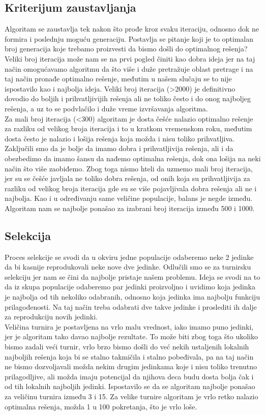 \documentclass[a4paper]{article}
\begin{document}
\subsection{Kriterijum zaustavljanja}
Algoritam se zaustavlja tek nakon što prođe kroz svaku iteraciju, odnosno dok ne formira i poslednju moguću generaciju. Postavlja se pitanje koji je to optimalan broj generacija koje trebamo proizvesti da bismo došli do optimalnog rešenja? \\ 
Veliki broj iteracija može nam se na prvi pogled činiti kao dobra ideja jer na taj način omogućavamo algoritmu da što više i duže pretražuje oblast pretrage i na taj način pronađe optimalno rešenje, međutim u našem slučaju se to nije ispostavilo kao i najbolja ideja. Veliki broj iteracija (>2000) je definitivno dovodio do boljih i prihvatljivijih rešenja ali ne toliko često i do onog najboljeg rešenja, a uz to se podvlačilo i duže vreme izvršavanja algoritma. \\
Za mali broj iteracija (<300) algoritam je dosta češće nalazio optimalno rešenje za razliku od velikog broja iteracija i to u kratkom vremenskom roku, međutim dosta često je nalazio i lošija rešenja koja možda i nisu toliko prihvatljiva. \\
Zaključili smo da je bolje da imamo dobra i prihvatljivija rešenja, ali i da obezbedimo da imamo šansu da nađemo optimalna rešenja, dok ona lošija na neki način što više zaobiđemo. Zbog toga nismo hteli da uzmemo mali broj iteracija, jer su se češće javljala ne toliko dobra rešenja, od onih koja su prihvatljivija za razliku od velikog broja iteracija gde su se više pojavljivala dobra rešenja ali ne i najbolja. Kao i u određivanju same veličine populacije, balans je negde između. Algoritam nam se najbolje ponašao za izabrani broj iteracija između 500 i 1000. \cite{numOfGener}

\subsection{Selekcija}
Proces selekcije se svodi da u okviru jedne populacije odaberemo neke 2 jedinke da bi kasnije reprodukovali neke nove dve jedinke. Odlučili smo se za turnirsku selekciju jer nam se čini da najbolje pristaje našem problemu. Ideja se svodi na to da iz skupa populacije odaberemo par jedinki proizvoljno i uvidimo koja jedinka je najbolja od tih nekoliko odabranih, odnosno koja jedinka ima najbolju funkciju prilagođenosti. Na taj način treba odabrati dve takve jedinke i proslediti ih dalje za reprodukciju novih jedinki. \\
Veličina turnira je postavljena na vrlo malu vrednost, iako imamo puno jedinki, jer je algoritam tako davao najbolje rezultate. To može biti zbog toga što ukoliko bismo zadali veći turnir, vrlo brzo bismo došli do već nekih ustaljenih lokalnih najboljih rešenja koja bi se stalno takmičila i stalno pobeđivala, pa na taj način ne bismo dozvoljavali možda nekim drugim jedinkama koje i nisu toliko trenutno prilagodljive, ali možda imaju potencijal da njihova deca budu dosta bolja čak i od tih lokalnih najboljih jedinki. Ispostavilo se da se algoritam najbolje ponašao za veličinu turnira između 3 i 15. Za velike turnire algoritam je vrlo retko nalazio optimalna rešenja, možda 1 u 100 pokretanja, što je vrlo loše.
\end{document}

